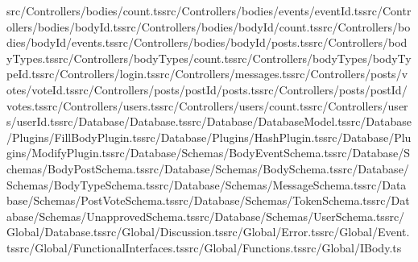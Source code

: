 \documentclass[a4paper,12pt]{article}
\begin{document}
src/Controllers/bodies/count.ts\newline src/Controllers/bodies/events/{eventId}.ts\newline src/Controllers/bodies/{bodyId}.ts\newline src/Controllers/bodies/{bodyId}/count.ts\newline src/Controllers/bodies/{bodyId}/events.ts\newline src/Controllers/bodies/{bodyId}/posts.ts\newline src/Controllers/bodyTypes.ts\newline src/Controllers/bodyTypes/count.ts\newline src/Controllers/bodyTypes/{bodyTypeId}.ts\newline src/Controllers/login.ts\newline src/Controllers/messages.ts\newline src/Controllers/posts/votes/{voteId}.ts\newline src/Controllers/posts/{postId}/posts.ts\newline src/Controllers/posts/{postId}/votes.ts\newline src/Controllers/users.ts\newline src/Controllers/users/count.ts\newline src/Controllers/users/{userId}.ts\newline src/Database/Database.ts\newline src/Database/DatabaseModel.ts\newline src/Database/Plugins/FillBodyPlugin.ts\newline src/Database/Plugins/HashPlugin.ts\newline src/Database/Plugins/ModifyPlugin.ts\newline src/Database/Schemas/BodyEventSchema.ts\newline src/Database/Schemas/BodyPostSchema.ts\newline src/Database/Schemas/BodySchema.ts\newline src/Database/Schemas/BodyTypeSchema.ts\newline src/Database/Schemas/MessageSchema.ts\newline src/Database/Schemas/PostVoteSchema.ts\newline src/Database/Schemas/TokenSchema.ts\newline src/Database/Schemas/UnapprovedSchema.ts\newline src/Database/Schemas/UserSchema.ts\newline src/Global/Database.ts\newline src/Global/Discussion.ts\newline src/Global/Error.ts\newline src/Global/Event.ts\newline src/Global/FunctionalInterfaces.ts\newline src/Global/Functions.ts\newline src/Global/IBody.ts\newline 
\end{document}
